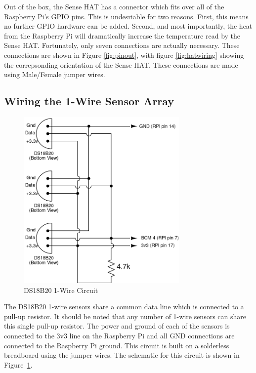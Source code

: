\documentclass[journal]{new-aiaa}
\begin{document}
Out of the box, the Sense HAT has a connector which fits over all of
the Raspberry Pi's GPIO pins.  This is undesriable for two reasons.
First, this means no further GPIO hardware can be added.  Second, and
most importantly, the heat from the Raspberry Pi will dramatically
increase the temperature read by the Sense HAT.  Fortunately, only
seven connections are actually necessary.  These connections are shown
in Figure \ref{fig:pinout}, with figure \ref{fig:hatwiring} showing
the correpsonding orientation of the Sense HAT.  These connections are
made using Male/Female jumper wires.

\subsection{Wiring the 1-Wire Sensor Array}
\begin{figure}
    \centering
    \includegraphics[height=3.5in]{images/ds18b20-circuit}
    \caption{DS18B20 1-Wire Circuit}
    \label{fig:circuit}
\end{figure}
The DS18B20 1-wire sensors share a common data line which is connected
to a pull-up resistor.  It should be noted that any number of 1-wire
sensors can share this single pull-up resistor.  The power and ground
of each of the sensors is connected to the 3v3 line on the Raspberry
Pi and all GND connections are connected to the Raspberry Pi ground.
This circuit is built on a solderless breadboard using the jumper
wires.  The schematic for this circuit is shown in
Figure~\ref{fig:circuit}. 
\end{document}
